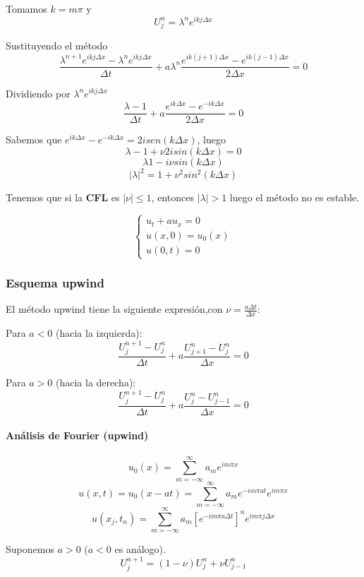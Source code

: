 Tomamos $k=m\pi$ y 
$$U_j^n = \lambda^n e^{ikj\Delta x}$$ 

Sustituyendo el método
$$\frac{\lambda^{n+1}e^{ikj\Delta x}-\lambda^ne^{ikj\Delta x}}{\Delta t} + a\lambda^n \frac{e^{ik(j+1)\Delta x}-e^{ik(j-1)\Delta x}}{2\Delta x} = 0$$

Dividiendo por $\lambda^ne^{ikj\Delta x}$
$$\frac{\lambda -1}{\Delta t} + a \frac{e^{ik\Delta x}-e^{-ik\Delta x}}{2\Delta x} = 0$$

Sabemos que $e^{ik\Delta x}-e^{-ik\Delta x} = 2isen(k\Delta x)$, luego
$$\lambda -1 +\nu 2isin(k\Delta x) = 0$$
$$\lambda 1-i\nu sin(k\Delta x)$$
$$|\lambda|^2 = 1+\nu^2sin^2(k\Delta x)$$

Tenemos que si la \textbf{CFL} es $|\nu|\le 1$, entonces $|\lambda|>1$ luego el método no es estable.

\begin{example}
	\begin{equation*}
		\left\{
		\begin{array}{l}
			u_t + au_x = 0\\
			u(x,0) = u_0(x)\\
			u(0,t) = 0
		\end{array}
		\right.
	\end{equation*}
\end{example}

\subsubsection{Esquema upwind}
El método upwind tiene la siguiente expresión,con $\nu = \frac{a\Delta t}{\Delta x}$:

Para $a < 0$ (hacia la izquierda):
$$\frac{U_{j}^{n+1}-U_{j}^{n}}{\Delta t} + a\frac{U_{j+1}^{n}-U_{j}^{n}}{\Delta x} = 0$$

Para $a > 0$ (hacia la derecha):
$$\frac{U_{j}^{n+1}-U_{j}^{n}}{\Delta t} + a\frac{U_{j}^{n}-U_{j-1}^{n}}{\Delta x} = 0$$

\paragraph{Análisis de Fourier (upwind)}
$$u_0(x) = \sum_{m=-\infty}^{\infty}a_m e^{im\pi x}$$
$$u(x,t) = u_0(x-at) = \sum_{m=-\infty}^\infty a_m e^{-im\pi a t}e^{im\pi x}$$
$$u(x_j, t_n) = \sum_{m=-\infty}^\infty a_m\left[e^{-im\pi a \Delta t}\right]^ne^{im\pi j \Delta x}$$

Suponemos $a>0$ ($a<0$ es análogo).
$$U_{j}^{n+1} = (1-\nu)U_{j}^{n}+\nu U_{j-1}^{n}$$

